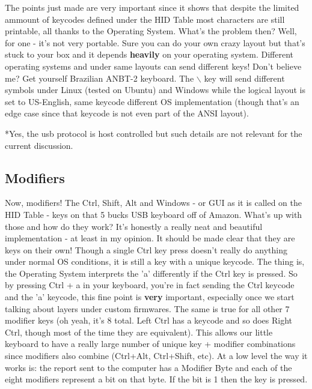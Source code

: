 \documentclass[11pt]{article}
\begin{document}
The points just made are very important since it shows that despite the limited ammount of keycodes defined under the HID Table most characters are still printable, all thanks to the Operating System. What's the problem then? Well, for one - it's not very portable. Sure you can do your own crazy layout but that's stuck to your box and it depends \textbf{heavily} on your operating system. Different operating systems and under same layouts can send different keys! Don't believe me? Get yourself Brazilian ANBT-2 keyboard. The $\backslash$ key will send different symbols under Linux (tested on Ubuntu) and Windows while the logical layout is set to US-English, same keycode different OS implementation (though that's an edge case since that keycode is not even part of the ANSI layout). 

*Yes, the usb protocol is host controlled but such details are not relevant for the current discussion.

\subsection{Modifiers}
\label{sec:org94d37bd}
Now, modifiers! The Ctrl, Shift, Alt and Windows - or GUI as it is called on the HID Table - keys on that 5 bucks USB keyboard off of Amazon. What's up with those and how do they work? It's honestly a really neat and beautiful implementation - at least in my opinion. It should be made clear that they are keys on their own! Though a single Ctrl key press doesn't really do anything under normal OS conditions, it is still a key with a unique keycode. The thing is, the Operating System interprets the 'a' differently if the Ctrl key is pressed. So by pressing Ctrl + a in your keyboard, you're in fact sending the Ctrl keycode and the 'a' keycode, this fine point is \textbf{very} important, especially once we start talking about layers under custom firmwares. The same is true for all other 7 modifier keys (oh yeah, it's 8 total. Left Ctrl has a keycode and so does Right Ctrl, though most of the time they are equivalent). This allows our little keyboard to have a really large number of unique key + modifier combinations since modifiers also combine (Ctrl+Alt, Ctrl+Shift, etc). At a low level the way it works is: the report sent to the computer has a Modifier Byte and each of the eight modifiers represent a bit on that byte. If the bit is 1 then the key is pressed.
\end{document}
